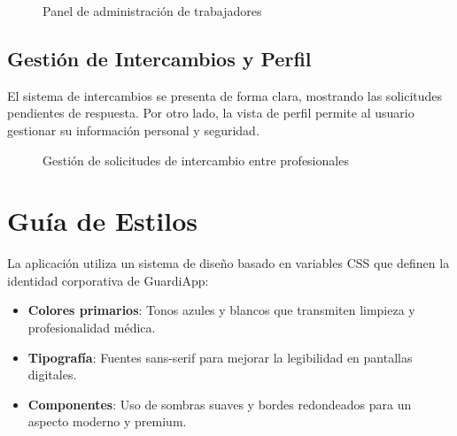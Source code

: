 \begin{figure}[H]
    \centering
    \caption{Panel de administración de trabajadores}
    \label{fig:ui-admin}
\end{figure}

\subsection{Gestión de Intercambios y Perfil}
El sistema de intercambios se presenta de forma clara, mostrando las solicitudes pendientes de respuesta. Por otro lado, la vista de perfil permite al usuario gestionar su información personal y seguridad.

\begin{figure}[H]
    \centering
    \caption{Gestión de solicitudes de intercambio entre profesionales}
    \label{fig:ui-swaps}
\end{figure}

\section{Guía de Estilos}
La aplicación utiliza un sistema de diseño basado en variables CSS que definen la identidad corporativa de GuardiApp:
\begin{itemize}
    \item \textbf{Colores primarios}: Tonos azules y blancos que transmiten limpieza y profesionalidad médica.
    \item \textbf{Tipografía}: Fuentes sans-serif para mejorar la legibilidad en pantallas digitales.
    \item \textbf{Componentes}: Uso de sombras suaves y bordes redondeados para un aspecto moderno y premium.
\end{itemize}
